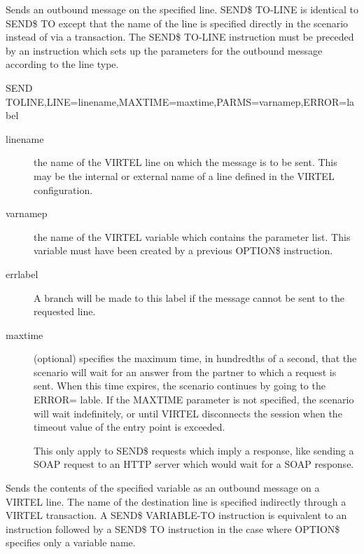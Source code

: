 \documentclass[letterpaper,10pt,english]{sphinxmanual}
\begin{document}

Sends an outbound message on the specified line. SEND\$ TO-LINE is identical to SEND\$ TO except that the name of the line is specified directly in the scenario instead of via a transaction. The SEND\$ TO-LINE instruction must be preceded by an {\hyperref[\detokenize{User_Guide:v457ug-option}]{}} instruction which sets up the parameters for the outbound message according to the line type.

\begin{sphinxVerbatim}[commandchars=\\\{\}]
SEND\PYGZdl{} TO\PYGZhy{}LINE,LINE=\PYGZsq{}linename\PYGZsq{},MAXTIME=maxtime,PARMS=\PYGZsq{}varnamep\PYGZsq{},ERROR=label
\end{sphinxVerbatim}
\begin{description}
\item[{linename}] \leavevmode
the name of the VIRTEL line on which the message is to be sent. This may be the internal or external name of a line defined in the VIRTEL configuration.

\item[{varnamep}] \leavevmode
the name of the VIRTEL variable which contains the parameter list. This variable must have been created by a previous OPTION\$ instruction.

\item[{errlabel}] \leavevmode
A branch will be made to this label if the message cannot be sent to the requested line.

\item[{maxtime}] \leavevmode
(optional) specifies the maximum time, in hundredths of a second, that the scenario will wait for an answer from the partner to which a request is sent. When this time expires, the scenario continues by going to the ERROR= lable. If the MAXTIME parameter is not specified, the scenario will wait indefinitely, or until VIRTEL disconnects the session when the timeout value of the entry point is exceeded.

This only apply to SEND\$ requests which imply a response, like sending a SOAP request to an HTTP server which would wait for a SOAP response.

\end{description}


Sends the contents of the specified variable as an outbound message on a VIRTEL line. The name of the destination line is specified indirectly through a VIRTEL transaction. A SEND\$ VARIABLE-TO instruction is equivalent to an {\hyperref[\detokenize{User_Guide:v457ug-option}]{}}  instruction followed by a SEND\$ TO instruction in the case where OPTION\$ specifies only a variable name.
\end{document}
